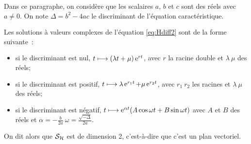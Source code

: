 Dans ce paragraphe, on considère que les scalaires \(a\), \(b\) et \(c\) sont 
des réels avec \(a \neq 0\). On note \(\Delta = b^2-4ac\) le discriminant de 
l'équation caractéristique.
\begin{theo}
  \label{theo:6}
  Les solutions à valeurs complexes de l'équation \eqref{eq:Hdiff2} sont de la 
  forme suivante~:
  \begin{itemize}
    \item si le discriminant est nul, \(t \longmapsto (\lambda t + 
      \mu)\operatorname{e}^{rt}\), avec \(r\) la racine double et \(\lambda \ \mu\) des 
      réels;
    \item si le discriminant est positif, \(t \longmapsto \lambda \operatorname{e}^{r_1 t} 
      + \mu \operatorname{e}^{r_2 t}\), avec \(r_1 \ r_2\) les racines et \(\lambda \ 
      \mu\) des réels;
    \item si le discriminant est négatif, \(t \longmapsto \operatorname{e}^{\alpha t} (A 
      \cos \omega t + B \sin \omega t)\) avec \(A\) et \(B\) des réels et 
      \(\alpha = -\frac{b}{2a} \ \omega = \frac{\sqrt{-\Delta}}{2a}\).
  \end{itemize}
  On dit alors que \(\mathcal{S}_{\mathcal{H}}\) est de dimension 2, c'est-à-dire que c'est un plan vectoriel.
\end{theo}

